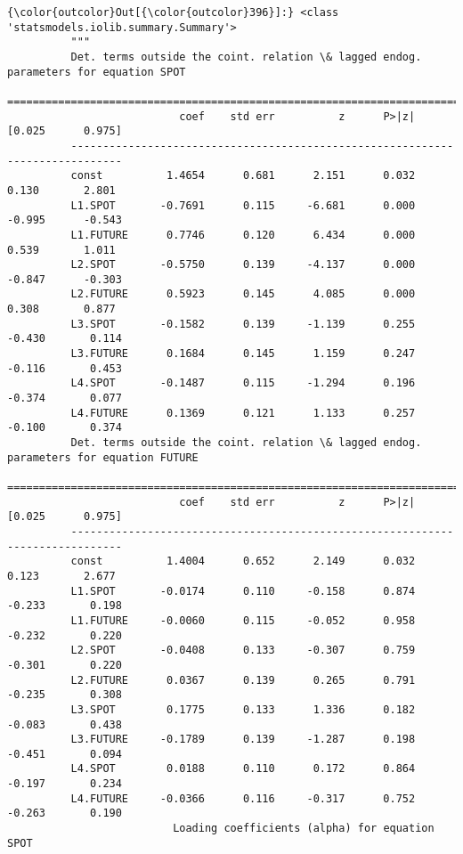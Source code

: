\documentclass[11pt]{article}
\begin{document}
\begin{Verbatim}[commandchars=\\\{\}]
{\color{outcolor}Out[{\color{outcolor}396}]:} <class 'statsmodels.iolib.summary.Summary'>
          """
          Det. terms outside the coint. relation \& lagged endog. parameters for equation SPOT
          ==============================================================================
                           coef    std err          z      P>|z|      [0.025      0.975]
          ------------------------------------------------------------------------------
          const          1.4654      0.681      2.151      0.032       0.130       2.801
          L1.SPOT       -0.7691      0.115     -6.681      0.000      -0.995      -0.543
          L1.FUTURE      0.7746      0.120      6.434      0.000       0.539       1.011
          L2.SPOT       -0.5750      0.139     -4.137      0.000      -0.847      -0.303
          L2.FUTURE      0.5923      0.145      4.085      0.000       0.308       0.877
          L3.SPOT       -0.1582      0.139     -1.139      0.255      -0.430       0.114
          L3.FUTURE      0.1684      0.145      1.159      0.247      -0.116       0.453
          L4.SPOT       -0.1487      0.115     -1.294      0.196      -0.374       0.077
          L4.FUTURE      0.1369      0.121      1.133      0.257      -0.100       0.374
          Det. terms outside the coint. relation \& lagged endog. parameters for equation FUTURE
          ==============================================================================
                           coef    std err          z      P>|z|      [0.025      0.975]
          ------------------------------------------------------------------------------
          const          1.4004      0.652      2.149      0.032       0.123       2.677
          L1.SPOT       -0.0174      0.110     -0.158      0.874      -0.233       0.198
          L1.FUTURE     -0.0060      0.115     -0.052      0.958      -0.232       0.220
          L2.SPOT       -0.0408      0.133     -0.307      0.759      -0.301       0.220
          L2.FUTURE      0.0367      0.139      0.265      0.791      -0.235       0.308
          L3.SPOT        0.1775      0.133      1.336      0.182      -0.083       0.438
          L3.FUTURE     -0.1789      0.139     -1.287      0.198      -0.451       0.094
          L4.SPOT        0.0188      0.110      0.172      0.864      -0.197       0.234
          L4.FUTURE     -0.0366      0.116     -0.317      0.752      -0.263       0.190
                          Loading coefficients (alpha) for equation SPOT                

\end{Verbatim}
\end{document}

